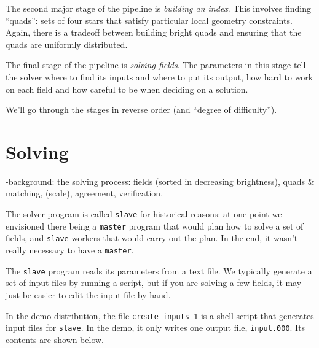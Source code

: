 \documentclass[12pt,letterpaper,titlepage]{article}
\newcommand{\code}[1]{\texttt{#1}}
\begin{document}
The second major stage of the pipeline is \emph{building an index}.  This involves finding
``quads'': sets of four stars that satisfy particular local geometry constraints.  Again, there
is a tradeoff between building bright quads and ensuring that the quads are uniformly distributed.

The final stage of the pipeline is \emph{solving fields}.  The parameters in this stage tell the
solver where to find its inputs and where to put its output, how hard to work on each field
and how careful to be when deciding on a solution.

We'll go through the stages in reverse order (and ``degree of difficulty'').

\section{Solving}

-background: the solving process: fields (sorted in decreasing brightness),
 quads \& matching, (scale), agreement, verification.

The solver program is called \code{slave} for historical reasons: at one point we envisioned
there being a \code{master} program that would plan how to solve a set of fields, and \code{slave}
workers that would carry out the plan.  In the end, it wasn't really necessary to have a \code{master}.

The \code{slave} program reads its parameters from a text file.  We typically generate a set of
input files by running a script, but if you are solving a few fields, it may just be easier to edit
the input file by hand.

In the demo distribution, the file \code{create-inputs-1} is a shell script that generates
input files for \code{slave}.  In the demo, it only writes one output file, \code{input.000}.
Its contents are shown below.
\end{document}
